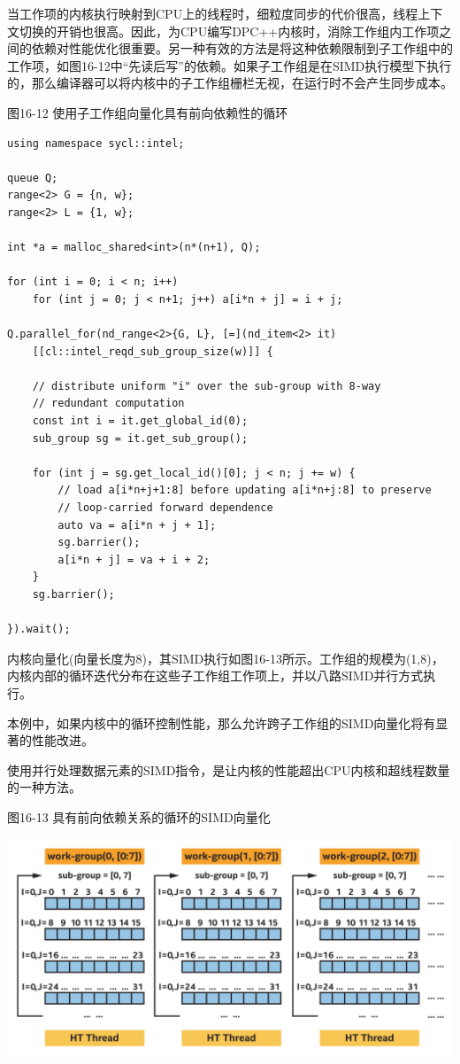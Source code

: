 当工作项的内核执行映射到CPU上的线程时，细粒度同步的代价很高，线程上下文切换的开销也很高。因此，为CPU编写DPC++内核时，消除工作组内工作项之间的依赖对性能优化很重要。另一种有效的方法是将这种依赖限制到子工作组中的工作项，如图16-12中“先读后写”的依赖。如果子工作组是在SIMD执行模型下执行的，那么编译器可以将内核中的子工作组栅栏无视，在运行时不会产生同步成本。\par

\hspace*{\fill} \par %
图16-12 使用子工作组向量化具有前向依赖性的循环
\begin{lstlisting}[caption={}]
using namespace sycl::intel;

queue Q;
range<2> G = {n, w};
range<2> L = {1, w};

int *a = malloc_shared<int>(n*(n+1), Q);

for (int i = 0; i < n; i++)
	for (int j = 0; j < n+1; j++) a[i*n + j] = i + j;
	
Q.parallel_for(nd_range<2>{G, L}, [=](nd_item<2> it)
	[[cl::intel_reqd_sub_group_size(w)]] {
		
	// distribute uniform "i" over the sub-group with 8-way
	// redundant computation
	const int i = it.get_global_id(0);
	sub_group sg = it.get_sub_group();
	
	for (int j = sg.get_local_id()[0]; j < n; j += w) {
		// load a[i*n+j+1:8] before updating a[i*n+j:8] to preserve
		// loop-carried forward dependence
		auto va = a[i*n + j + 1];
		sg.barrier();
		a[i*n + j] = va + i + 2;
	}
	sg.barrier();
	
}).wait();
\end{lstlisting}

内核向量化(向量长度为8)，其SIMD执行如图16-13所示。工作组的规模为(1,8)，内核内部的循环迭代分布在这些子工作组工作项上，并以八路SIMD并行方式执行。\par

本例中，如果内核中的循环控制性能，那么允许跨子工作组的SIMD向量化将有显著的性能改进。\par

使用并行处理数据元素的SIMD指令，是让内核的性能超出CPU内核和超线程数量的一种方法。\par

\hspace*{\fill} \par %
图16-13 具有前向依赖关系的循环的SIMD向量化
\begin{center}
	\includegraphics[width=1.0\textwidth]{content/chapter-16/images/7}
\end{center}

